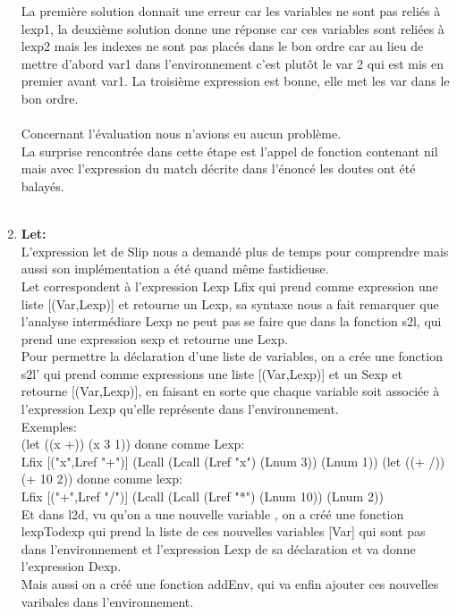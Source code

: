 \documentclass{article}
\begin{document}
\begin{enumerate}
    La première solution donnait une erreur car les variables ne sont pas reliés à lexp1, la deuxième solution donne une réponse car ces variables sont reliées à lexp2 mais les indexes ne sont pas placés dans le bon ordre car au lieu de mettre d’abord var1 dans l’environnement c’est plutôt le var 2 qui est mis en premier avant var1. La troisième expression est bonne, elle met les var dans le bon ordre.\\ \\
    Concernant l’évaluation nous n’avions eu aucun problème.\\
    La surprise rencontrée dans cette étape est l’appel de fonction contenant nil mais avec l’expression du match décrite dans l’énoncé les doutes ont été balayés.\\ \\


\item
    \textbf{Let:}\\
    L'expression let de Slip nous a demandé plus de temps pour comprendre mais aussi son implémentation a été quand même fastidieuse.\\
    Let correspondent à l'expression Lexp Lfix qui prend comme expression  une liste [(Var,Lexp)] et retourne un Lexp, sa syntaxe nous a fait remarquer que l'analyse intermédiare Lexp ne peut pas se faire que dans la fonction s2l, qui prend une expression sexp et retourne une Lexp.\\
    
    Pour permettre la déclaration d'une liste de variables, on a crée une fonction s2l' qui prend comme expressions une liste [(Var,Lexp)] et un Sexp et retourne [(Var,Lexp)], en faisant en sorte que chaque variable soit associée à l'expression Lexp qu'elle représente dans l'environnement.\\
    
    Exemples:\\
    (let ((x +)) (x 3 1))  donne comme Lexp:
    \\Lfix [("x",Lref "+")] (Lcall (Lcall (Lref "x") (Lnum 3)) (Lnum 1))
    (let ((+ /)) (+ 10 2)) donne comme lexp:
    \\Lfix [("+",Lref "/")] (Lcall (Lcall (Lref "*") (Lnum 10)) (Lnum 2))\\
    
    Et dans l2d, vu qu'on a une nouvelle variable , on a créé une fonction lexpTodexp qui prend la liste de ces nouvelles variables [Var] qui sont pas dans l'environnement et l'expression Lexp de sa déclaration et va donne l'expression Dexp.\\
    Mais aussi on a créé une fonction addEnv, qui va enfin ajouter ces nouvelles varibales dans l'environnement.\\
    

\end{enumerate}
\end{document}

